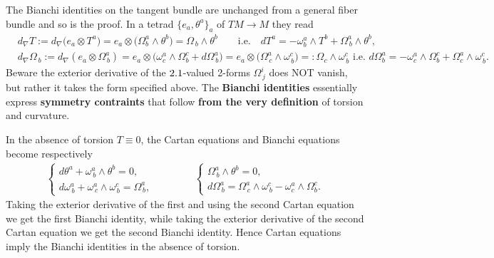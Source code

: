 \begin{mytheorem}
%
The Bianchi identities on the tangent bundle are unchanged from a general fiber bundle and so is the proof.
In a tetrad $\{e_a,\theta^a\}_a$ of $TM\to M$ they read
{\small
\begin{align}
    &d_\nabla T :=d_\nabla\big(e_a\otimes T^a\big)= e_a\otimes \big(\Omega^a_b \wedge \theta^b\big) = \Omega_{\, b} \wedge \theta^b\qquad \text{i.e.}\quad dT^a = -\omega_b^a\wedge T^b +\Omega^a_{\, b} \wedge \theta^b,
    \\
    &d_\nabla \Omega_{\, b} :=d_\nabla (e_a \otimes \Omega^a_{\, b})= e_a \!\otimes\! \Big(\omega_c^a\wedge \Omega^c_b + d \Omega_{\, b}^a\Big) = e_a \!\otimes\! \Big(\Omega^a_{\, c} \wedge \omega^c_{\, b}\Big) =: \Omega_c \wedge \omega^c_{\, b} \,\, \text{i.e.}\,\, d\Omega^a_b = -\omega^a_c\wedge \Omega^c_b + \Omega^a_c \wedge \omega^c_{\, b}.
\end{align}}
Beware the exterior derivative of the $2.1$-valued 2-forms $\Omega^i_{\, j}$ does NOT vanish, but rather it takes the form specified above.
The \textbf{Bianchi identities} essentially express \textbf{symmetry contraints} that follow \textbf{from the very definition} of torsion and curvature.
\end{mytheorem}


\begin{mytheorem}
In the absence of torsion $T\equiv 0$, the Cartan equations and Bianchi equations become respectively
\begin{align}\label{eq:cartan_bianchi_no_torsion}
    \begin{cases}
    d \theta^a + \omega^a_{\, b} \wedge \theta^b = 0,
    \\[4pt]
    d \omega^a_{\, b} + \omega^a_{\, c} \wedge \omega^c_{\, b} = \Omega^a_{\, b},
    \end{cases}
    \qquad\qquad
    \begin{cases}
    \Omega^a_{\, b} \wedge \theta^b = 0,
    \\[4pt]
    d \Omega^a_{\, b} = \Omega^a_{\, c} \wedge \omega^c_{\, b} - \omega^a_c\wedge \Omega^c_b.
    \end{cases}
\end{align}
Taking the exterior derivative of the first and using the second Cartan equation we get the first Bianchi identity, while taking the exterior derivative of the second Cartan equation we get the second Bianchi identity.
Hence Cartan equations imply the Bianchi identities in the absence of torsion.
\end{mytheorem}


